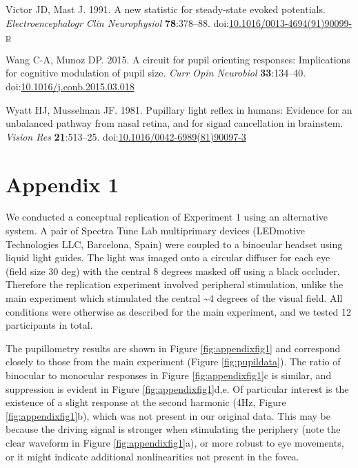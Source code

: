 \documentclass[
]{article}
\newlength{\cslhangindent}
\newlength{\cslentryspacingunit} %
\newenvironment{CSLReferences}[2] %
 {%
  \setlength{\parindent}{0pt}
  \ifodd #1
  \let\oldpar\par
  \def\par{\hangindent=\cslhangindent\oldpar}
  \fi
  \setlength{\parskip}{#2\cslentryspacingunit}
 }%
 {}
\newcommand{\beginsupplement}{\setcounter{table}{0}
\renewcommand{\thetable}{A\arabic{table}}
\setcounter{figure}{0}
\renewcommand{\thefigure}{A\arabic{figure}}}
\begin{document}
\begin{CSLReferences}{1}{0}
\leavevmode{}%
Victor JD, Mast J. 1991. A new statistic for steady-state evoked potentials. \emph{Electroencephalogr Clin Neurophysiol} \textbf{78}:378--88. doi:\href{https://doi.org/10.1016/0013-4694(91)90099-p}{10.1016/0013-4694(91)90099-p}

\leavevmode{}%
Wang C-A, Munoz DP. 2015. A circuit for pupil orienting responses: Implications for cognitive modulation of pupil size. \emph{Curr Opin Neurobiol} \textbf{33}:134--40. doi:\href{https://doi.org/10.1016/j.conb.2015.03.018}{10.1016/j.conb.2015.03.018}

\leavevmode{}%
Wyatt HJ, Musselman JF. 1981. Pupillary light reflex in humans: Evidence for an unbalanced pathway from nasal retina, and for signal cancellation in brainstem. \emph{Vision Res} \textbf{21}:513--25. doi:\href{https://doi.org/10.1016/0042-6989(81)90097-3}{10.1016/0042-6989(81)90097-3}

\end{CSLReferences}

\hypertarget{appendix-1}{%
\section{Appendix 1}\label{appendix-1}}

\beginsupplement

We conducted a conceptual replication of Experiment 1 using an alternative system. A pair of Spectra Tune Lab multiprimary devices (LEDmotive Technologies LLC, Barcelona, Spain) were coupled to a binocular headset using liquid light guides. The light was imaged onto a circular diffuser for each eye (field size 30 deg) with the central 8 degrees masked off using a black occluder. Therefore the replication experiment involved peripheral stimulation, unlike the main experiment which stimulated the central \textasciitilde4 degrees of the visual field. All conditions were otherwise as described for the main experiment, and we tested 12 participants in total.

The pupillometry results are shown in Figure \ref{fig:appendixfig1} and correspond closely to those from the main experiment (Figure \ref{fig:pupildata}). The ratio of binocular to monocular responses in Figure \ref{fig:appendixfig1}c is similar, and suppression is evident in Figure \ref{fig:appendixfig1}d,e. Of particular interest is the existence of a slight response at the second harmonic (4Hz, Figure \ref{fig:appendixfig1}b), which was not present in our original data. This may be because the driving signal is stronger when stimulating the periphery (note the clear waveform in Figure \ref{fig:appendixfig1}a), or more robust to eye movements, or it might indicate additional nonlinearities not present in the fovea.
\end{document}
